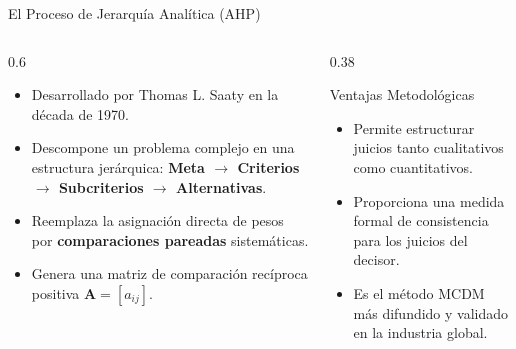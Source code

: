 \documentclass[aspectratio=169, 10pt]{beamer}
\begin{document}
\begin{frame}{El Proceso de Jerarquía Analítica (AHP)}
    \begin{columns}[T]
        \begin{column}{0.6\textwidth}
            \begin{itemize}
                \item Desarrollado por Thomas L. Saaty en la década de 1970.
                \item Descompone un problema complejo en una estructura jerárquica:
                      \textbf{Meta $\rightarrow$ Criterios $\rightarrow$ Subcriterios $\rightarrow$ Alternativas}.
                \item Reemplaza la asignación directa de pesos por \textbf{comparaciones pareadas} sistemáticas.
                \item Genera una matriz de comparación recíproca positiva $\mathbf{A} = [a_{ij}]$.
            \end{itemize}
        \end{column}
        \begin{column}{0.38\textwidth}
            \begin{exampleblock}{Ventajas Metodológicas}
                \scriptsize
                \begin{itemize}
                    \item Permite estructurar juicios tanto cualitativos como cuantitativos.
                    \item Proporciona una medida formal de consistencia para los juicios del decisor.
                    \item Es el método MCDM más difundido y validado en la industria global.
                \end{itemize}
            \end{exampleblock}
        \end{column}
    \end{columns}
\end{frame}
\end{document}
